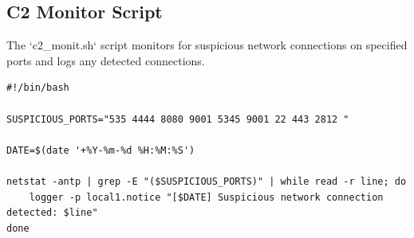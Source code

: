 \documentclass[Master,BMR,english]{twbook}
\begin{document}
\subsection{C2 Monitor Script}
The `c2\_monit.sh` script monitors for suspicious network connections on specified ports and logs any detected connections.

\begin{verbatim}
#!/bin/bash

SUSPICIOUS_PORTS="535 4444 8080 9001 5345 9001 22 443 2812 "

DATE=$(date '+%Y-%m-%d %H:%M:%S')

netstat -antp | grep -E "($SUSPICIOUS_PORTS)" | while read -r line; do
    logger -p local1.notice "[$DATE] Suspicious network connection detected: $line"
done
\end{verbatim}
\end{document}
